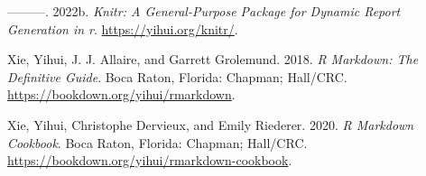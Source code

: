 \documentclass[
]{book}
\newlength{\cslhangindent}
\newlength{\cslentryspacingunit} %
\newenvironment{CSLReferences}[2] %
 {%
  \setlength{\parindent}{0pt}
  \ifodd #1
  \let\oldpar\par
  \def\par{\hangindent=\cslhangindent\oldpar}
  \fi
  \setlength{\parskip}{#2\cslentryspacingunit}
 }%
 {}
\begin{document}
\begin{CSLReferences}{1}{0}
\leavevmode{}%
---------. 2022b. \emph{Knitr: A General-Purpose Package for Dynamic Report Generation in r}. \url{https://yihui.org/knitr/}.

\leavevmode{}%
Xie, Yihui, J. J. Allaire, and Garrett Grolemund. 2018. \emph{R Markdown: The Definitive Guide}. Boca Raton, Florida: Chapman; Hall/CRC. \url{https://bookdown.org/yihui/rmarkdown}.

\leavevmode{}%
Xie, Yihui, Christophe Dervieux, and Emily Riederer. 2020. \emph{R Markdown Cookbook}. Boca Raton, Florida: Chapman; Hall/CRC. \url{https://bookdown.org/yihui/rmarkdown-cookbook}.

\end{CSLReferences}
\end{document}
